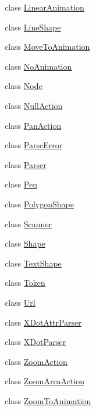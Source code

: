 \begin{DoxyCompactItemize}
class \hyperlink{classsmacc__viewer_1_1xdot_1_1xdot__qt_1_1LinearAnimation}{Linear\+Animation}
\item 
class \hyperlink{classsmacc__viewer_1_1xdot_1_1xdot__qt_1_1LineShape}{Line\+Shape}
\item 
class \hyperlink{classsmacc__viewer_1_1xdot_1_1xdot__qt_1_1MoveToAnimation}{Move\+To\+Animation}
\item 
class \hyperlink{classsmacc__viewer_1_1xdot_1_1xdot__qt_1_1NoAnimation}{No\+Animation}
\item 
class \hyperlink{classsmacc__viewer_1_1xdot_1_1xdot__qt_1_1Node}{Node}
\item 
class \hyperlink{classsmacc__viewer_1_1xdot_1_1xdot__qt_1_1NullAction}{Null\+Action}
\item 
class \hyperlink{classsmacc__viewer_1_1xdot_1_1xdot__qt_1_1PanAction}{Pan\+Action}
\item 
class \hyperlink{classsmacc__viewer_1_1xdot_1_1xdot__qt_1_1ParseError}{Parse\+Error}
\item 
class \hyperlink{classsmacc__viewer_1_1xdot_1_1xdot__qt_1_1Parser}{Parser}
\item 
class \hyperlink{classsmacc__viewer_1_1xdot_1_1xdot__qt_1_1Pen}{Pen}
\item 
class \hyperlink{classsmacc__viewer_1_1xdot_1_1xdot__qt_1_1PolygonShape}{Polygon\+Shape}
\item 
class \hyperlink{classsmacc__viewer_1_1xdot_1_1xdot__qt_1_1Scanner}{Scanner}
\item 
class \hyperlink{classsmacc__viewer_1_1xdot_1_1xdot__qt_1_1Shape}{Shape}
\item 
class \hyperlink{classsmacc__viewer_1_1xdot_1_1xdot__qt_1_1TextShape}{Text\+Shape}
\item 
class \hyperlink{classsmacc__viewer_1_1xdot_1_1xdot__qt_1_1Token}{Token}
\item 
class \hyperlink{classsmacc__viewer_1_1xdot_1_1xdot__qt_1_1Url}{Url}
\item 
class \hyperlink{classsmacc__viewer_1_1xdot_1_1xdot__qt_1_1XDotAttrParser}{X\+Dot\+Attr\+Parser}
\item 
class \hyperlink{classsmacc__viewer_1_1xdot_1_1xdot__qt_1_1XDotParser}{X\+Dot\+Parser}
\item 
class \hyperlink{classsmacc__viewer_1_1xdot_1_1xdot__qt_1_1ZoomAction}{Zoom\+Action}
\item 
class \hyperlink{classsmacc__viewer_1_1xdot_1_1xdot__qt_1_1ZoomAreaAction}{Zoom\+Area\+Action}
\item 
class \hyperlink{classsmacc__viewer_1_1xdot_1_1xdot__qt_1_1ZoomToAnimation}{Zoom\+To\+Animation}
\end{DoxyCompactItemize}
